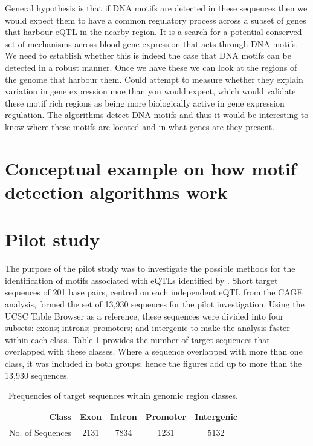 \documentclass[12pt, onecolumn, oneside]{gsajnl}
\begin{document}
General hypothesis is that if DNA motifs are detected in these sequences then we would expect them to have a common regulatory process
across a subset of genes that harbour eQTL in the nearby region. It is a search for a potential conserved set of mechanisms across
blood gene expression that acts through DNA motifs. We need to establish whether this is indeed the case that DNA motifs can be detected in
a robust manner. Once we have these we can look at the regions of the genome that harbour them. Could attempt to measure whether they explain
variation in gene expression moe than you would expect, which would validate these motif rich regions as being more biologically active in gene
expression regulation. The algorithms detect DNA motifs and thus it would be interesting to know where these motifs are located and in what genes
are they present. 

\section{Conceptual example on how motif detection algorithms work}


\section{Pilot study}

The purpose of the pilot study was to investigate the possible methods for the identification of motifs associated with eQTLs identified by  \citet{lloyd2017genetic}. Short target sequences of 201 base pairs, centred on each independent eQTL from the CAGE analysis, formed the set of 13,930 sequences for the pilot investigation. Using the UCSC Table Browser \citep{karolchik2004ucsc} as a reference, these sequences were divided into four subsets: exons; introns; promoters; and intergenic to make the analysis faster within each class. Table 1 provides the number of target sequences that overlapped with these classes. Where a sequence overlapped with more than one class, it was included in both groups; hence the figures add up to more than the 13,930 sequences.

\begin{table}[!htpb]
\centering
\caption{Frequencies of target sequences within genomic region classes.}\label{freqTargetSeq}
\begin{tabular}{r|cccc}
\hline
Class & Exon & Intron & Promoter & Intergenic\\ \hline
No. of Sequences & 2131 & 7834 & 1231 & 5132\\ \hline
\end{tabular}
\label{tab: target}
\end{table}
\end{document}
